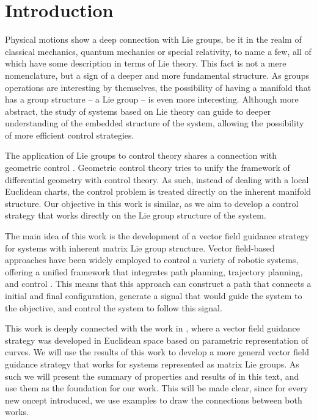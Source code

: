 \chapter{Introduction}\label{chap:Intro}
Physical motions show a deep connection with Lie groups, be it in the realm of classical mechanics, quantum mechanics or special relativity, to name a few, all of which have some description in terms of Lie theory. This fact is not a mere nomenclature, but a sign of a deeper and more fundamental structure. As groups operations are interesting by themselves, the possibility of having a manifold that has a group structure -- a Lie group -- is even more interesting. Although more abstract, the study of systems based on Lie theory can guide to deeper understanding of the embedded structure of the system, allowing the possibility of more efficient control strategies.

The application of Lie groups to control theory shares a connection with geometric control \citep{Bullo2004}. Geometric control theory tries to unify the framework of differential geometry with control theory. As such, instead of dealing with a local Euclidean charts, the control problem is treated directly on the inherent manifold structure. Our objective in this work is similar, as we aim to develop a control strategy that works directly on the Lie group structure of the system. 

The main idea of this work is the development of a vector field guidance strategy for systems with inherent matrix Lie group structure. Vector field-based approaches have been widely employed to control a variety of robotic systems, offering a unified framework that integrates path planning, trajectory planning, and control \citep{goncalves2010vectorfield,yao2021singularity,Rezende2022,Gao2022,nunes2023quadcopter,yao2022topological,Chen2025}. This means that this approach can construct a path that connects a initial and final configuration, generate a signal that would guide the system to the objective, and control the system to follow this signal. 

This work is deeply connected with the work in \citet{Rezende2022}, where a vector field guidance strategy was developed in Euclidean space based on parametric representation of curves. We will use the results of this work to develop a more general vector field guidance strategy that works for systems represented as matrix Lie groups. As such we will present the summary of properties and results of \citet{Rezende2022} in this text, and use them as the foundation for our work. This will be made clear, since for every new oncept introduced, we use examples to draw the connections between both works.

